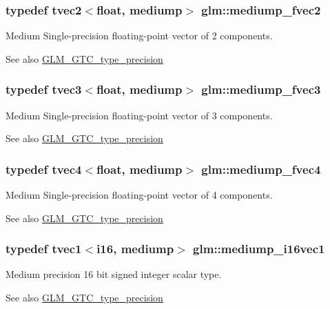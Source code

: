 \subsubsection[{mediump\+\_\+fvec2}]{\setlength{\rightskip}{0pt plus 5cm}typedef tvec2$<$float, mediump$>$ {\bf glm\+::mediump\+\_\+fvec2}}\label{namespaceglm_aeb4a9a86b1932957717a9aa118da91dd}
Medium Single-\/precision floating-\/point vector of 2 components. \begin{DoxySeeAlso}{See also}
\hyperlink{group__gtc__type__precision}{G\+L\+M\+\_\+\+G\+T\+C\+\_\+type\+\_\+precision} 
\end{DoxySeeAlso}
\hypertarget{namespaceglm_a3a6858b762ae37a54a04632719abf368}{}
\subsubsection[{mediump\+\_\+fvec3}]{\setlength{\rightskip}{0pt plus 5cm}typedef tvec3$<$float, mediump$>$ {\bf glm\+::mediump\+\_\+fvec3}}\label{namespaceglm_a3a6858b762ae37a54a04632719abf368}
Medium Single-\/precision floating-\/point vector of 3 components. \begin{DoxySeeAlso}{See also}
\hyperlink{group__gtc__type__precision}{G\+L\+M\+\_\+\+G\+T\+C\+\_\+type\+\_\+precision} 
\end{DoxySeeAlso}
\hypertarget{namespaceglm_a4054e80ce187977ed0b307a53d0c0dcd}{}
\subsubsection[{mediump\+\_\+fvec4}]{\setlength{\rightskip}{0pt plus 5cm}typedef tvec4$<$float, mediump$>$ {\bf glm\+::mediump\+\_\+fvec4}}\label{namespaceglm_a4054e80ce187977ed0b307a53d0c0dcd}
Medium Single-\/precision floating-\/point vector of 4 components. \begin{DoxySeeAlso}{See also}
\hyperlink{group__gtc__type__precision}{G\+L\+M\+\_\+\+G\+T\+C\+\_\+type\+\_\+precision} 
\end{DoxySeeAlso}
\hypertarget{namespaceglm_a44708bca96da21c5887ca277cf26ddc8}{}
\subsubsection[{mediump\+\_\+i16vec1}]{\setlength{\rightskip}{0pt plus 5cm}typedef tvec1$<${\bf i16}, mediump$>$ {\bf glm\+::mediump\+\_\+i16vec1}}\label{namespaceglm_a44708bca96da21c5887ca277cf26ddc8}
Medium precision 16 bit signed integer scalar type. \begin{DoxySeeAlso}{See also}
\hyperlink{group__gtc__type__precision}{G\+L\+M\+\_\+\+G\+T\+C\+\_\+type\+\_\+precision} 
\end{DoxySeeAlso}
\hypertarget{namespaceglm_a30e41646d450633d867c38d82c113ba0}{}
